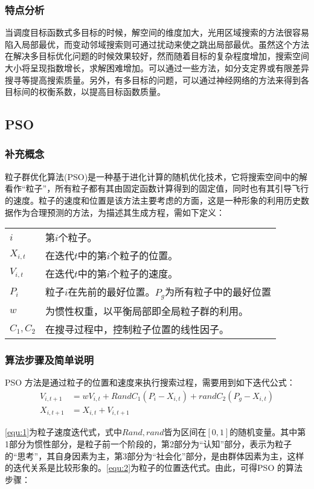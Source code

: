 \subsubsection{特点分析}
当调度目标函数式多目标的时候，解空间的维度加大，光用区域搜索的方法很容易陷入局部最优，而变动邻域搜索则可通过扰动来使之跳出局部最优。虽然这个方法在解决多目标优化问题的时候效果较好，然而随着目标的复杂程度增加，搜索空间大小将呈现指数增长，求解困难增加。可以通过一些方法，如分支定界或有限差异搜寻等提高搜索质量。另外，有多目标的问题，可以通过神经网络的方法来得到各目标间的权衡系数，以提高目标函数质量。
\subsection{PSO}
\subsubsection{补充概念}
粒子群优化算法(PSO)是一种基于进化计算的随机优化技术，它将搜索空间中的解看作``粒子''，所有粒子都有其由固定函数计算得到的固定值，同时也有其引导飞行的速度。粒子的速度和位置是该方法主要考虑的方面，这是一种形象的利用历史数据作为合理预测的方法，为描述其生成方程，需如下定义：

\vspace{1em}	
\begin{tabular}{ll}	
$i$ & 第$i$个粒子。\\
$X_{i,t}$ & 在迭代$t$中的第$i$个粒子的位置。\\
$V_{i,t}$& 在迭代$t$中的第$i$个粒子的速度。\\
$P_i$&粒子$i$在先前的最好位置。$P_g$为所有粒子中的最好位置\\
$w$&为惯性权重，以平衡局部即全局粒子群的利用。\\
$C_1,C_2$& 在搜寻过程中，控制粒子位置的线性因子。
\end{tabular}
\subsubsection{算法步骤及简单说明}
PSO 方法是通过粒子的位置和速度来执行搜索过程，需要用到如下迭代公式：
\begin{align}
V_{i,t+1} &= wV_{i,t} + Rand C_1(P_i - X_{i,t}) + rand C_2 (P_g - X_{i,t})\label{equ:1}\\
X_{i,t+1} &= X_{i,t} + V_{i,t+1}\label{equ:2}
\end{align}

\eqref{equ:1}为粒子速度迭代式，式中$Rand,rand$皆为区间在$[0,1]$的随机变量。其中第1部分为惯性部分，是粒子前一个阶段的，第2部分为``认知''部分，表示为粒子的``思考''，其自身因素为主，第3部分为``社会化''部分，是由群体因素为主，这样的迭代关系是比较形象的。\eqref{equ:2}为粒子的位置迭代式。由此，可得PSO 的算法步骤：

